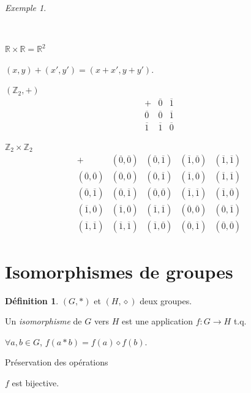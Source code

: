 \documentclass{report}
\newcommand*{\reels}{\mathbb{R}}
\newcommand*{\entiers}{\mathbb{Z}}
\theoremstyle{definition}
\newtheorem*{defin}{D\'efinition}
\theoremstyle{remark}
\newtheorem*{exem}{Exemple}
\begin{document}
	\begin{exem}
		\begin{ulist}~

			\item $\reels \times \reels = \reels^2$

			$(x,y)+(x',y')=(x+x',y+y')$.
			\item $(\entiers_2,+)$
			\renewcommand{\arraystretch}{1.5}
			\[
			\begin{array}{c||c|c}
				+&\overline0&\overline1\\
				\hline\hline
				\overline0&\overline0&\overline1\\
				\hline
				\overline1&\overline1&\overline0
			\end{array}
			\]

			$\entiers_2 \times \entiers_2$
			\[
			\begin{array}{c||c|c|c|c}
				+&(\overline0,\overline0)& (\overline0,\overline1)& (\overline1,\overline0)& (\overline1,\overline1)\\
				\hline\hline
				(\overline0,\overline0)& (\overline0,\overline0)& (\overline0,\overline1)& (\overline1,\overline0)& (\overline1,\overline1)\\
				\hline
				(\overline0,\overline1)& (\overline0,\overline1)& (\overline0,\overline0)& (\overline1,\overline1)& (\overline1,\overline0)\\
				\hline
				(\overline1,\overline0)& (\overline1,\overline0)& (\overline1,\overline1)& (\overline0,\overline0)& (\overline0,\overline1)\\
				\hline
				(\overline1,\overline1)& (\overline1,\overline1)& (\overline1,\overline0)& (\overline0,\overline1)& (\overline0,\overline0)
			\end{array}
			\]
			\renewcommand{\arraystretch}{1}
		\end{ulist}
	\end{exem}
	\section*{Isomorphismes de groupes}
	\begin{defin}
		$(G,*)$ et $(H,\diamond)$ deux groupes.

		Un \emph{isomorphisme} de $G$ vers $H$ est une application $f:G \to H$ t.q.
		\begin{nlist}[noitemsep]
			\item $\forall a,b \in G$, $f(a*b)=f(a)\diamond f(b)$.

			Pr\'eservation des op\'erations
			\item $f$ est bijective.
		\end{nlist}
	\end{defin}
\end{document}
